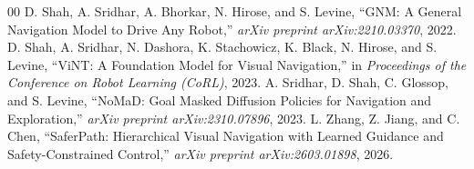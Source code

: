 \documentclass[conference]{IEEEtran}
\begin{document}
\begin{thebibliography}{00}
 D. Shah, A. Sridhar, A. Bhorkar, N. Hirose, and S. Levine, ``GNM: A General Navigation Model to Drive Any Robot,'' \textit{arXiv preprint arXiv:2210.03370}, 2022.
 D. Shah, A. Sridhar, N. Dashora, K. Stachowicz, K. Black, N. Hirose, and S. Levine, ``ViNT: A Foundation Model for Visual Navigation,'' in \textit{Proceedings of the Conference on Robot Learning (CoRL)}, 2023.
 A. Sridhar, D. Shah, C. Glossop, and S. Levine, ``NoMaD: Goal Masked Diffusion Policies for Navigation and Exploration,'' \textit{arXiv preprint arXiv:2310.07896}, 2023.
 L. Zhang, Z. Jiang, and C. Chen, ``SaferPath: Hierarchical Visual Navigation with Learned Guidance and Safety-Constrained Control,'' \textit{arXiv preprint arXiv:2603.01898}, 2026.
\end{thebibliography}
\end{document}
